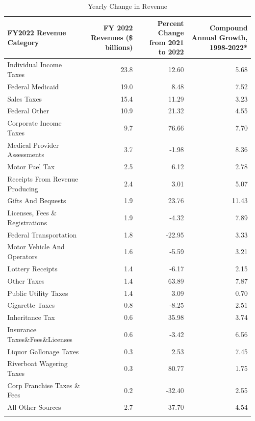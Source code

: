 \documentclass[
  letterpaper,
  DIV=11,
  numbers=noendperiod]{scrreport}
\begin{document}
\begin{table}

\caption{Yearly Change in Revenue}
\centering
\begin{tabular}[t]{l|r|r|r}
\hline
FY2022 Revenue Category & FY 2022 Revenues (\$ billions) & Percent Change from 2021 to 2022 & Compound Annual Growth, 1998-2022*\\
\hline
Individual Income Taxes & 23.8 & 12.60 & 5.68\\
\hline
Federal Medicaid & 19.0 & 8.48 & 7.52\\
\hline
Sales Taxes & 15.4 & 11.29 & 3.23\\
\hline
Federal Other & 10.9 & 21.32 & 4.55\\
\hline
Corporate Income Taxes & 9.7 & 76.66 & 7.70\\
\hline
Medical Provider Assessments & 3.7 & -1.98 & 8.36\\
\hline
Motor Fuel Tax & 2.5 & 6.12 & 2.78\\
\hline
Receipts From Revenue Producing & 2.4 & 3.01 & 5.07\\
\hline
Gifts And Bequests & 1.9 & 23.76 & 11.43\\
\hline
Licenses, Fees \& Registrations & 1.9 & -4.32 & 7.89\\
\hline
Federal Transportation & 1.8 & -22.95 & 3.33\\
\hline
Motor Vehicle And Operators & 1.6 & -5.59 & 3.21\\
\hline
Lottery Receipts & 1.4 & -6.17 & 2.15\\
\hline
Other Taxes & 1.4 & 63.89 & 7.87\\
\hline
Public Utility Taxes & 1.4 & 3.09 & 0.70\\
\hline
Cigarette Taxes & 0.8 & -8.25 & 2.51\\
\hline
Inheritance Tax & 0.6 & 35.98 & 3.74\\
\hline
Insurance Taxes\&Fees\&Licenses & 0.6 & -3.42 & 6.56\\
\hline
Liquor Gallonage Taxes & 0.3 & 2.53 & 7.45\\
\hline
Riverboat Wagering Taxes & 0.3 & 80.77 & 1.75\\
\hline
Corp Franchise Taxes \& Fees & 0.2 & -32.40 & 2.55\\
\hline
All Other Sources & 2.7 & 37.70 & 4.54\\
\hline
\cellcolor{gray}{\textcolor{black}{\textbf{Total}}} & \cellcolor{gray}{\textcolor{black}{\textbf{104.5}}} & \cellcolor{gray}{\textcolor{black}{\textbf{14.16}}} & \cellcolor{gray}{\textcolor{black}{\textbf{5.16}}}\\
\hline
\end{tabular}
\end{table}
\end{document}
